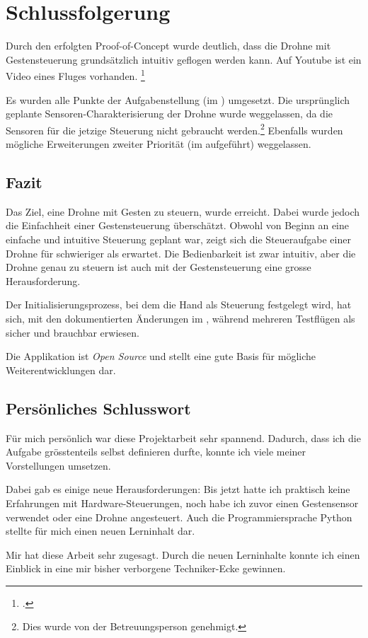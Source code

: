 \chapter{Schlussfolgerung}
Durch den erfolgten Proof-of-Concept wurde deutlich, dass die Drohne mit Gestensteuerung grundsätzlich intuitiv geflogen werden kann.
Auf Youtube ist ein Video eines Fluges vorhanden.
\footcite{Crazyflie_20_with_Leap_Motion_Gesture_controlled_YouTube_2015-09-04}

Es wurden alle Punkte der Aufgabenstellung (im ) umgesetzt.
Die ursprünglich geplante Sensoren-Charakterisierung der Drohne wurde weggelassen, da die Sensoren für die jetzige Steuerung nicht gebraucht werden.\footnote{Dies wurde von der Betreuungsperson genehmigt.}
Ebenfalls wurden mögliche Erweiterungen zweiter Priorität (im  aufgeführt) weggelassen.

\section{Fazit}
Das Ziel, eine Drohne mit Gesten zu steuern, wurde erreicht.
Dabei wurde jedoch die Einfachheit einer Gestensteuerung überschätzt.
Obwohl von Beginn an eine einfache und intuitive Steuerung geplant war, zeigt sich die Steueraufgabe einer Drohne für schwieriger als erwartet.
Die Bedienbarkeit ist zwar intuitiv, aber die Drohne genau zu steuern ist auch mit der Gestensteuerung eine grosse Herausforderung.

Der Initialisierungsprozess, bei dem die Hand als Steuerung festgelegt wird, hat sich, mit den dokumentierten Änderungen im , während mehreren Testflügen als sicher und brauchbar erwiesen.

Die Applikation ist \textit{Open Source} und stellt eine gute Basis für mögliche Weiterentwicklungen dar.


\section{Persönliches Schlusswort}
Für mich persönlich war diese Projektarbeit sehr spannend.
Dadurch, dass ich die Aufgabe grösstenteils selbst definieren durfte, konnte ich viele meiner Vorstellungen umsetzen.

Dabei gab es einige neue Herausforderungen:
Bis jetzt hatte ich praktisch keine Erfahrungen mit Hardware-Steuerungen, noch habe ich zuvor einen Gestensensor verwendet oder eine Drohne angesteuert.
Auch die Programmiersprache Python stellte für mich einen neuen Lerninhalt dar.

Mir hat diese Arbeit sehr zugesagt.
Durch die neuen Lerninhalte konnte ich einen Einblick in eine mir bisher verborgene Techniker-Ecke gewinnen.
